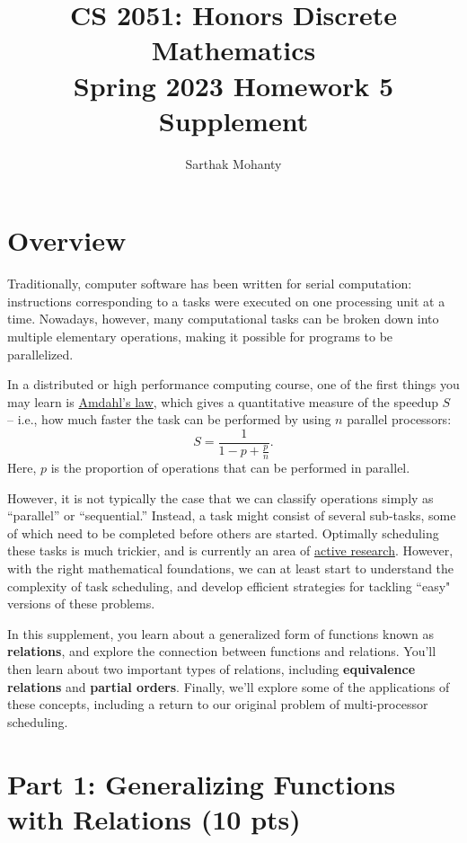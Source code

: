 \documentclass{article}
\title{\vspace{-1cm}CS 2051: Honors Discrete Mathematics \\Spring 2023 Homework 5 Supplement}
\author{Sarthak Mohanty }
\date{}
\begin{document}
\maketitle

\section*{Overview}

   \qquad Traditionally, computer software has been written for serial computation: instructions corresponding to a tasks were executed on one processing unit at a time. Nowadays, however, many computational tasks can be broken down into multiple elementary operations, making it possible for programs to be parallelized.

    \vspace{2mm}
    \qquad In a distributed or high performance computing course, one of the first things you may learn is \href{https://en.wikipedia.org/wiki/Amdahls_law}{Amdahl’s law}, which gives a quantitative measure of the speedup $S$ -- i.e., how much faster the task can be performed by using $n$ parallel processors: $$S = \frac{1}{1 - p + \frac{p}{n}}.$$ Here, $p$ is the proportion of operations that can be performed in parallel.


    \vspace{2mm}
    \qquad However, it is not typically the case that we can classify operations simply as “parallel” or “sequential.” Instead, a task might consist of several sub-tasks, some of which need to be completed before others are started. Optimally scheduling these tasks is much trickier, and is currently an area of \href{https://www.cs.umd.edu/~samir/DCscheduling18/slides/Janardhan Kulkarni.pdf}{active research}. However, with the right mathematical foundations, we can at least start to understand the complexity of task scheduling, and develop efficient strategies for tackling ``easy" versions of these problems.

    \vspace{2mm}
    \qquad In this supplement, you learn about a generalized form of functions known as \textbf{relations}, and explore the connection between functions and relations. You'll then learn about two important types of relations, including \textbf{equivalence relations} and \textbf{partial orders}. Finally, we'll explore some of the applications of these concepts, including a return to our original problem of multi-processor scheduling.

\section*{Part 1: Generalizing Functions with Relations (10 pts)}
\end{document}
